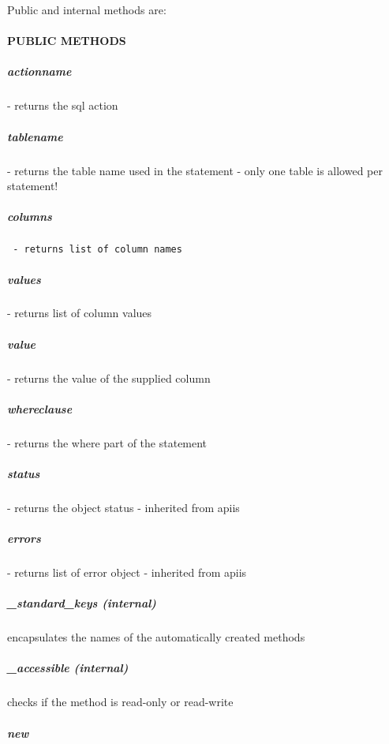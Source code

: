 Public and internal methods are:

\paragraph*{PUBLIC METHODS\label{Statement_PUBLIC_METHODS}}
\subparagraph*{actionname\label{Statement_actionname}}


- returns the sql action

\subparagraph*{tablename\label{Statement_tablename}}


- returns the table name used in the statement - only one table is allowed per statement!

\subparagraph*{columns\label{Statement_columns}}
\begin{verbatim}
 - returns list of column names
\end{verbatim}
\subparagraph*{values\label{Statement_values}}


- returns list of column values

\subparagraph*{value\label{Statement_value}}


- returns the value of the supplied column

\subparagraph*{whereclause\label{Statement_whereclause}}


- returns the where part of the statement

\subparagraph*{status\label{Statement_status}}


- returns the object status - inherited from apiis

\subparagraph*{errors\label{Statement_errors}}


- returns list of error object - inherited from apiis

\subparagraph*{\_standard\_keys (internal)\label{Statement__standard_keys_internal_}}


encapsulates the names of the automatically created methods

\subparagraph*{\_accessible (internal)\label{Statement__accessible_internal_}}


checks if the method is read-only or read-write

\subparagraph*{new\label{Statement_new}}


